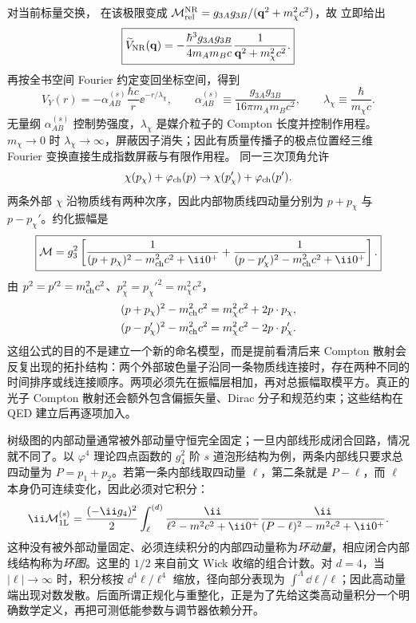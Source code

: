 对当前标量交换， 在该极限变成
$\mathcal M_{\rm rel}^{\rm NR}=g_{3A}g_{3B}/(\mathbf q^2+m_\chi^2c^2)$，故 立即给出
\begin{equation}
 \boxed{
 \widetilde V_{\rm NR}(\mathbf q)
 =-\frac{\hbar^3g_{3A}g_{3B}}{4m_A m_Bc}
 \frac{1}{\mathbf q^2+m_\chi^2c^2}.}
 \label{eq:scalar-yukawa-momentum-kernel-dp68}
\end{equation}
再按全书空间 Fourier 约定变回坐标空间，得到
\begin{equation}
 \boxed{
 V_Y(r)=-\alpha_{AB}^{(s)}\frac{\hbar c}{r}\ee^{-r/\lambda_\chi},
 \qquad
 \alpha_{AB}^{(s)}\equiv\frac{g_{3A}g_{3B}}{16\pi m_A m_Bc^2},
 \qquad
 \lambda_\chi\equiv\frac{\hbar}{m_\chi c}.}
 \label{eq:scalar-yukawa-potential-dp49}
\end{equation}
无量纲 $\alpha_{AB}^{(s)}$ 控制势强度，$\lambda_\chi$ 是媒介粒子的 Compton 长度并控制作用程。$m_\chi\to0$ 时 $\lambda_\chi\to\infty$，屏蔽因子消失；因此有质量传播子的极点位置经三维 Fourier 变换直接生成指数屏蔽与有限作用程。
同一三次顶角允许
\begin{equation*}
 \chi(p_\chi)+\varphi_{\rm ch}(p)\to\chi(p_\chi')+\varphi_{\rm ch}(p').
\end{equation*}
两条外部 $\chi$ 沿物质线有两种次序，因此内部物质线四动量分别为 $p+p_\chi$ 与 $p-p_\chi'$。约化振幅是
\begin{equation}
 \boxed{
 \mathcal M
 =g_3^2\left[
 \frac1{(p+p_\chi)^2-m_{\rm ch}^2c^2+\ii0^+}
 +\frac1{(p-p_\chi')^2-m_{\rm ch}^2c^2+\ii0^+}
 \right].}
 \label{eq:scalar-compton-analogue-si-r10}
\end{equation}
由 $p^2=p'^2=m_{\rm ch}^2c^2$、$p_\chi^2=p_\chi'^2=m_\chi^2c^2$，
\begin{align*}
 (p+p_\chi)^2-m_{\rm ch}^2c^2&=m_\chi^2c^2+2p\cdot p_\chi,\\
 (p-p_\chi')^2-m_{\rm ch}^2c^2&=m_\chi^2c^2-2p\cdot p_\chi'.
\end{align*}
这组公式的目的不是建立一个新的命名模型，而是提前看清后来 Compton 散射会反复出现的拓扑结构：两个外部玻色量子沿同一条物质线连接时，存在两种不同的时间排序或线连接顺序。两项必须先在振幅层相加，再对总振幅取模平方。真正的光子 Compton 散射还会额外包含偏振矢量、Dirac 分子和规范约束；这些结构在 QED 建立后再逐项加入。

树级图的内部动量通常被外部动量守恒完全固定；一旦内部线形成闭合回路，情况就不同了。以 $\varphi^4$ 理论四点函数的 $g_4^2$ 阶 $s$ 道泡形结构为例，两条内部线只要求总四动量为 $P=p_1+p_2$。若第一条内部线取四动量 $\ell$，第二条就是 $P-\ell$，而 $\ell$ 本身仍可连续变化，因此必须对它积分：
\begin{equation}
 \ii\mathcal M_{\rm 1L}^{(s)}
 =
 \frac{(-\ii g_4)^2}{2}
 \int_{\ell}^{(d)}
 \frac{\ii}{\ell^2-m^2c^2+\ii0^+}
 \frac{\ii}{(P-\ell)^2-m^2c^2+\ii0^+}.
 \label{eq:phi4-bubble-toy-r12}
\end{equation}
这种没有被外部动量固定、必须连续积分的内部四动量称为\emph{环动量}，相应闭合内部线结构称为\emph{环图}。这里的 $1/2$ 来自前文 Wick 收缩的组合计数。对 $d=4$，当 $|\ell|\to\infty$ 时，积分核按 $\dd^4 \ell/\ell^4$ 缩放，径向部分表现为 $\int^{\Lambda}\dd\ell/\ell$；因此高动量端出现对数发散。后面所谓正规化与重整化，正是为了先给这类高动量积分一个明确数学定义，再把可测低能参数与调节器依赖分开。

